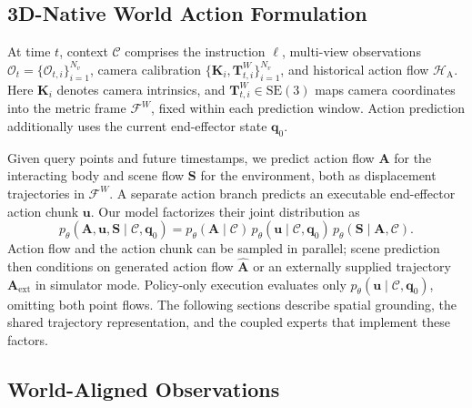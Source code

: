 \vspace{-0.2cm}
\subsection{3D-Native World Action Formulation}
\label{sec:method:formulation}
\vspace{-0.2cm}

At time $t$, context $\mathcal C$ comprises the instruction $\ell$,
multi-view observations $\mathcal O_t=\{\mathcal O_{t,i}\}_{i=1}^{N_v}$,
camera calibration $\{\mathbf K_i,\mathbf T^W_{t,i}\}_{i=1}^{N_v}$,
and historical action flow $\mathcal H_{\mathrm A}$.
Here $\mathbf K_i$ denotes camera intrinsics, and
$\mathbf T^W_{t,i}\in\mathrm{SE}(3)$ maps camera coordinates into the
metric frame $\mathcal F^W$, fixed within each prediction window.
Action prediction additionally uses the current end-effector state
$\mathbf q_0$.

Given query points and future timestamps, we predict action flow
$\mathbf A$ for the interacting body and scene flow $\mathbf S$ for
the environment, both as displacement trajectories in $\mathcal F^W$.
A separate action branch predicts an executable end-effector action
chunk $\mathbf u$. Our model factorizes their joint distribution as
\begin{equation}
    p_{\theta}(\mathbf A,\mathbf u,\mathbf S\mid\mathcal C,\mathbf q_0)
    =
    p_{\theta}(\mathbf A\mid\mathcal C)\,
    p_{\theta}(\mathbf u\mid\mathcal C,\mathbf q_0)\,
    p_{\theta}(\mathbf S\mid\mathbf A,\mathcal C).
    \label{eq:physwam_factorization}
\end{equation}
Action flow and the action chunk can be sampled in parallel; scene prediction
then conditions on generated action flow $\widehat{\mathbf A}$ or an
externally supplied trajectory $\mathbf A_{\mathrm{ext}}$ in simulator
mode. Policy-only execution evaluates only
$p_{\theta}(\mathbf u\mid\mathcal C,\mathbf q_0)$, omitting both point flows.
The following sections describe spatial grounding, the shared trajectory
representation, and the coupled experts that implement these factors.

\vspace{-0.2cm}

\subsection{World-Aligned Observations}
\label{sec:method:observation}
\vspace{-0.2cm}

